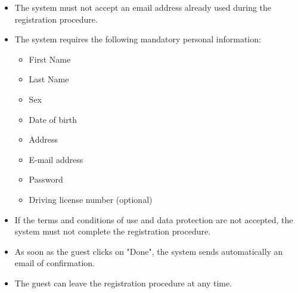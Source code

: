 \documentclass{article}
\begin{document}
	\begin{itemize}
		\item The system must not accept an email address already used during the registration procedure.
		\item The system requires the following mandatory personal information:
			\begin{itemize}
				\item First Name
				\item Last Name
				\item Sex
				\item Date of birth
				\item Address
				\item E-mail address
				\item Password
				\item Driving license number (optional)
			\end{itemize}
		\item If the terms and conditions of use and data protection are not accepted, the system must not complete the registration procedure.
		\item As soon as the guest clicks on "Done", the system sends automatically an email of confirmation.
		\item The guest can leave the registration procedure at any time.
	\end{itemize}
\end{document}
